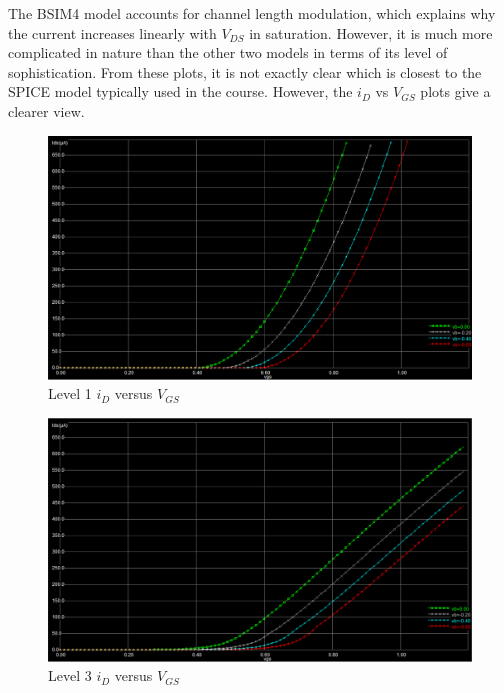 \FloatBarrier

The BSIM4 model accounts for channel length modulation, which explains why the current increases linearly with $V_{DS}$ in saturation.
However, it is much more complicated in nature than the other two models in terms of its level of sophistication.
From these plots, it is not exactly clear which is closest to the SPICE model typically used in the course.
However, the $i_{D}$ vs $V_{GS}$ plots give a clearer view.

\FloatBarrier

\begin{figure}[h!]
	\centering
	\includegraphics[scale=0.50]{./images/id_vgs_level1.PNG}
	\caption{Level 1 $i_{D}$ versus $V_{GS}$}
	\label{fig:id_vgs_level1}
\end{figure}

\FloatBarrier

\FloatBarrier

\begin{figure}[h!]
	\centering
	\includegraphics[scale=0.50]{./images/id_vgs_level3.PNG}
	\caption{Level 3 $i_{D}$ versus $V_{GS}$}
	\label{fig:id_vgs_level3}
\end{figure}

